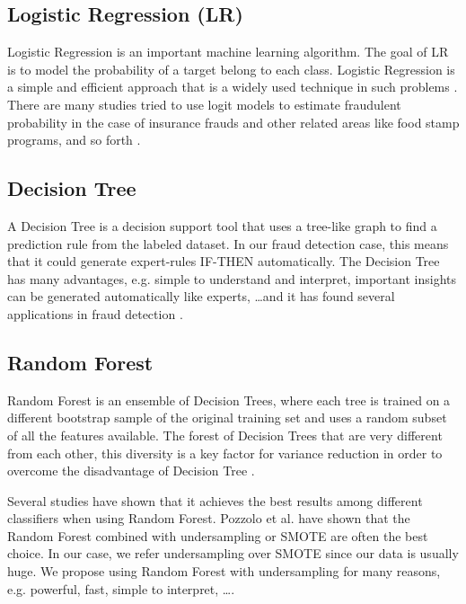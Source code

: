 \subsection*{Logistic Regression (LR)}

Logistic Regression \cite{walker1967estimation, cox1958regression} is an important machine learning algorithm. The goal of LR is to model the probability of a target belong to each class. Logistic Regression is a simple and efficient approach that is a widely used technique in such problems \cite{hosmer2013applied}. There are many studies tried to use logit models to estimate fraudulent probability in the case of insurance frauds \cite{jin2005binary, artis2002detection} and other related areas like food stamp programs, and so forth \cite{bollinger1997modeling, hausman1998misclassification, poterba1995unemployment}.


\subsection*{Decision Tree}

A Decision Tree is a decision support tool that uses a tree-like graph to find a prediction rule from the labeled dataset. In our fraud detection case, this means that it could generate expert-rules IF-THEN automatically. The Decision Tree has many advantages, e.g. simple to understand and interpret, important insights can be generated automatically like experts, \dots and it has found several applications in fraud detection \citep{csahin2011detecting, sahin2013cost, bahnsen2015example, lee2006mining}.


\subsection*{Random Forest}

Random Forest \citep{breiman2001random} is an ensemble of Decision Trees, where each tree is trained on a different bootstrap sample of the original training set and uses a random subset of all the features available. The forest of Decision Trees that are very different from each other, this diversity is a key factor for variance reduction in order to overcome the disadvantage of Decision Tree \citep{krogh1995neural}.

Several studies have shown that it achieves the best results among different classifiers \citep{dal2014learned, dal2015credit, van2015apate, whitrow2009transaction, bhattacharyya2011data, bahnsen2013cost} when using Random Forest. Pozzolo et al. \citep{dal2013racing} have shown that the Random Forest combined with undersampling or SMOTE are often the best choice. In our case, we refer undersampling over SMOTE since our data is usually huge. We propose using Random Forest with undersampling for many reasons, e.g. powerful, fast, simple to interpret, \dots.


